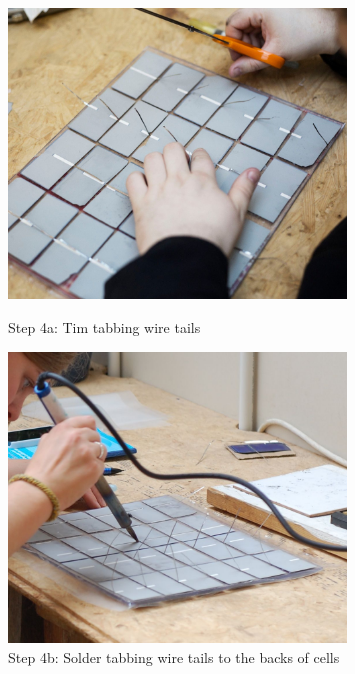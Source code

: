 \documentclass{article}
\theoremstyle{definition}
\theoremstyle{definition}
\theoremstyle{remark}
\begin{document}
  \begin{figure}[!ht]
    \begin{minipage}{0.25\textwidth}
        \centering
        \includegraphics[width=0.8\textwidth]{../Images/image_3_4_(step_4a).png}
        \caption*{Step 4a: Tim tabbing wire tails  }
    \end{minipage}\hfill
    \begin{minipage}{0.25\textwidth}
        \centering
        \includegraphics[width=0.8\textwidth]{../Images/image_3_5_(step_4b).png}
        \caption*{Step 4b: Solder tabbing wire tails to the backs of cells}
    \end{minipage}\hfill
    \begin{minipage}{0.25\textwidth}
        \centering

\end{minipage}
\end{figure}
\end{document}
